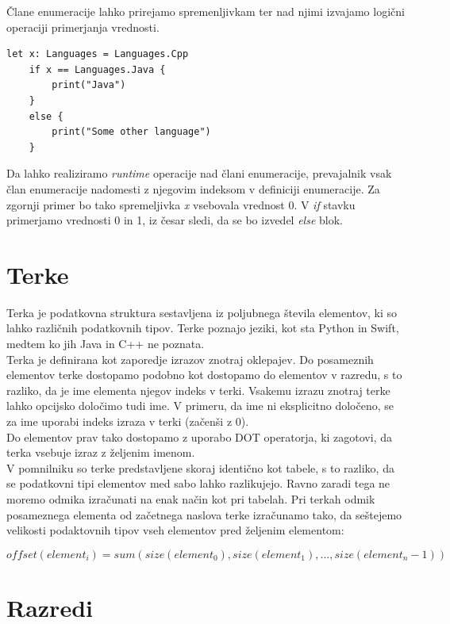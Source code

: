 \documentclass[a4paper, 12p]{book}
\begin{document}
Člane enumeracije lahko prirejamo spremenljivkam ter nad njimi izvajamo logični operaciji primerjanja vrednosti. 

\begin{lstlisting}[caption={}, captionpos=b]
	let x: Languages = Languages.Cpp
	if x == Languages.Java {
	    print("Java")
	}
	else {
	    print("Some other language")
	}
\end{lstlisting}

Da lahko realiziramo \textit{runtime} operacije nad člani enumeracije, prevajalnik vsak član enumeracije nadomesti z njegovim indeksom v definiciji enumeracije. Za zgornji primer bo tako spremeljivka \textit{x} vsebovala vrednost 0. V \textit{if} stavku primerjamo vrednosti 0 in 1, iz česar sledi, da se bo izvedel \textit{else} blok.

\newpage
\section{Terke}

Terka je podatkovna struktura sestavljena iz poljubnega števila elementov, ki so lahko različnih podatkovnih tipov. Terke poznajo jeziki, kot sta Python in Swift, medtem ko jih Java in C++ ne poznata.\\
\indent Terka je definirana kot zaporedje izrazov znotraj oklepajev. Do posameznih elementov terke dostopamo podobno kot dostopamo do elementov v razredu, s to razliko, da je ime elementa njegov indeks v terki. Vsakemu izrazu znotraj terke lahko opcijsko določimo tudi ime. V primeru, da ime ni eksplicitno določeno, se za ime uporabi indeks izraza v terki (začenši z 0). \\
\indent Do elementov prav tako dostopamo z uporabo DOT operatorja, ki zagotovi, da terka vsebuje izraz z željenim imenom.\\
\indent V pomnilniku so terke predstavljene skoraj identično kot tabele, s to razliko, da se podatkovni tipi elementov med sabo lahko razlikujejo. Ravno zaradi tega ne moremo odmika izračunati na enak način kot pri tabelah. Pri terkah odmik posameznega elementa od začetnega naslova terke izračunamo tako, da seštejemo velikosti podaktovnih tipov vseh elementov pred željenim elementom:

\[ offset ( element_i )  = sum ( size ( element_0 ), size( element_1 ), ..., size ( element_n-1)) \]

\section{Razredi}
\end{document}
